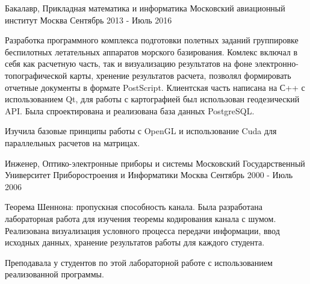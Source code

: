 

\begin{cventries}

  \cventry
    {Бакалавр, Прикладная математика и информатика} %
    {Московский авиационный институт} %
    {Москва} %
    {Сентябрь 2013 - Июль 2016} %
    {
      \begin{cvitems} %
        \item {Разработка программного комплекса подготовки полетных заданий группировке беспилотных летательных аппаратов морского базирования. Комлекс включал в себя как расчетную часть, так и визуализацию результатов на фоне электронно-топографической карты, хренение результатов расчета, позволял формировать отчетные документы в формате PostScript. Клиентская часть написана на С++ с использованием Qt, для работы с картографией был использован геодезический API. Была спроектирована и реализована база данных PostgreSQL.}
        \item {Изучила базовые принципы работы с OpenGL и использование Cuda для параллельных расчетов на матрицах.}
      \end{cvitems}
    }
  \cventry
    {Инженер, Оптико-электронные приборы и системы} %
    {Московский Государственный Университет Приборостроения и Информатики} %
    {Москва} %
    {Сентябрь 2000 - Июль 2006} %
    {
      \begin{cvitems} %
        \item {Теорема Шеннона: пропускная способность канала. Была разработана лабораторная работа для изучения теоремы кодирования канала с шумом. Реализована визуализация условного процесса передачи информации, ввод исходных данных, хранение результатов работы для каждого студента.}
        \item {Преподавала у студентов по этой лабораторной работе с использованием реализованной программы.}
      \end{cvitems}
    }

\end{cventries}
